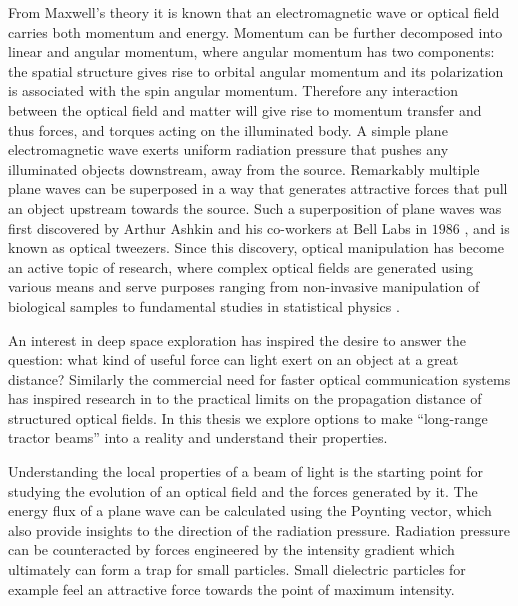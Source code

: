 From Maxwell's theory it is known that an electromagnetic wave or optical field carries both momentum and energy. Momentum can be further decomposed into linear and angular momentum, where angular momentum has two components: the spatial structure gives rise to orbital angular momentum \cite{Yao2011} and its polarization is associated with the spin angular momentum. Therefore any interaction between the optical field and matter will give rise to momentum transfer and thus forces, and torques acting on the illuminated body. A simple plane electromagnetic wave exerts uniform radiation pressure that pushes any illuminated objects downstream, away from the source. Remarkably multiple plane waves can be superposed in a way that generates attractive forces that pull an object upstream towards the source. Such a superposition of plane waves was first discovered by Arthur Ashkin and his co-workers at Bell Labs in $1986$ \cite{beth1936}, and is known as optical tweezers. Since this discovery, optical manipulation has become an active topic of research, where complex optical fields are generated using various means and serve purposes ranging from non-invasive manipulation of biological samples to fundamental studies in statistical physics \cite{Volpe:09,Sanchez2019,Leibler1994}.


An interest in deep space exploration has inspired the desire to answer the question: what kind of useful force can light exert on an object at a great distance? Similarly the commercial need for faster optical communication systems has inspired research in to the practical limits on the propagation distance of structured optical fields. In this thesis we explore options to make ``long-range tractor beams'' into a reality and understand their properties.


Understanding the local properties of a beam of light is the starting point for studying the evolution of an optical field and the forces generated by it. The energy flux of a plane wave can be calculated using the Poynting vector, which also provide insights to the direction of the radiation pressure. Radiation pressure can be counteracted by forces engineered by the intensity gradient which ultimately can form a trap for small particles. Small dielectric particles for example feel an attractive force towards the point of maximum intensity.


